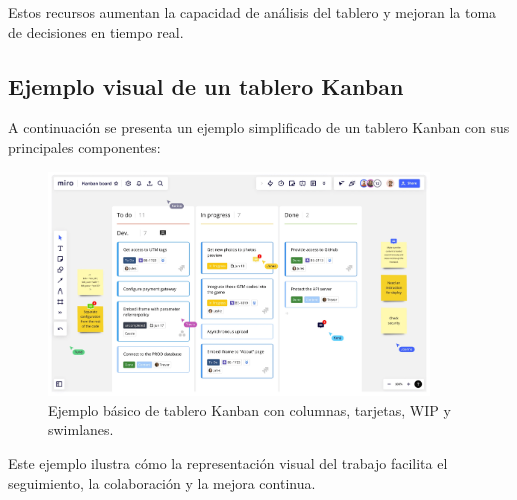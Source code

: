 Estos recursos aumentan la capacidad de análisis del tablero y mejoran la toma de decisiones en tiempo real.

\subsection{Ejemplo visual de un tablero Kanban}

A continuación se presenta un ejemplo simplificado de un tablero Kanban con sus principales componentes:

\begin{figure}[H]
\centering
\includegraphics[width=0.9\textwidth]{assets/images/kanban-ejemplo.png}
\caption{Ejemplo básico de tablero Kanban con columnas, tarjetas, WIP y swimlanes.}
\end{figure}

Este ejemplo ilustra cómo la representación visual del trabajo facilita el seguimiento, la colaboración y la mejora continua.

